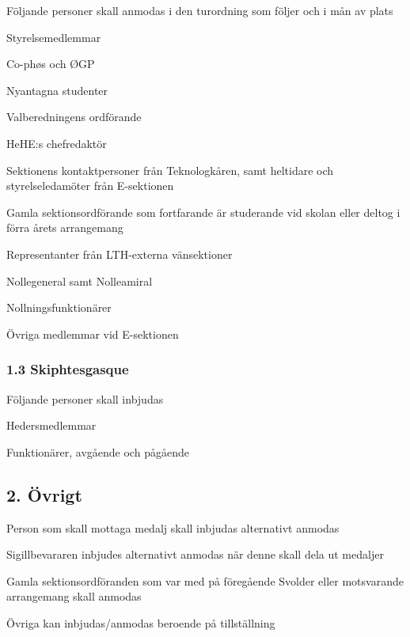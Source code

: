 \documentclass[10pt]{article}
\begin{document}
Följande personer skall anmodas i den turordning som följer och i mån av plats
\begin{dashlist}
    \item Styrelsemedlemmar 
    \item Co-phøs och ØGP
    \item Nyantagna studenter
    \item Valberedningens ordförande
    \item HeHE:s chefredaktör
    \item Sektionens kontaktpersoner från Teknologkåren, samt heltidare och styrelseledamöter från E-sektionen
    \item Gamla sektionsordförande som fortfarande är studerande vid skolan eller deltog i förra årets arrangemang
    \item Representanter från LTH-externa vänsektioner
    \item Nollegeneral samt Nolleamiral
    \item Nollningsfunktionärer
    \item Övriga medlemmar vid E-sektionen
\end{dashlist}

\subsubsection*{1.3 Skiphtesgasque}
Följande personer skall inbjudas
\begin{dashlist}
    \item Hedersmedlemmar
    \item Funktionärer, avgående och pågående
\end{dashlist}

\subsection*{2. Övrigt}

\begin{dashlist}
    \item Person som skall mottaga medalj skall inbjudas alternativt anmodas
    \item Sigillbevararen inbjudes alternativt anmodas när denne skall dela ut medaljer
    \item Gamla sektionsordföranden som var med på föregående Svolder eller motsvarande arrangemang skall anmodas
    \item Övriga kan inbjudas/anmodas beroende på tillställning
\end{dashlist}
\end{document}
